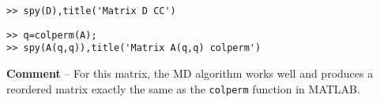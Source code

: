 \begin{enumerate}
    \newpage
    \begin{minipage}[t]{0.45\linewidth}
        
\begin{lstlisting}
>> spy(D),title('Matrix D CC')
\end{lstlisting}        
    \end{minipage}\hspace*{\fill}
    \begin{minipage}[t]{0.45\linewidth}
        
\begin{lstlisting}
>> q=colperm(A);
>> spy(A(q,q)),title('Matrix A(q,q) colperm')
\end{lstlisting}
    \end{minipage}\hspace*{\fill}

    \textbf{Comment} -- For this matrix, the MD algorithm works well and
    produces a reordered matrix exactly the same as the \texttt{colperm}
    function in MATLAB.


\end{enumerate}

